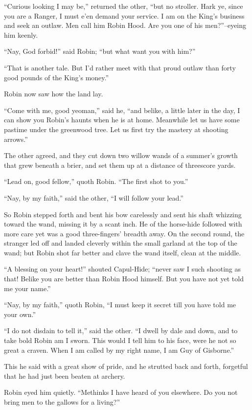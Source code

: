 ``Curious looking I may be,'' returned the other, ``but no stroller.
Hark ye, since you are a Ranger, I must e'en demand your service. I am
on the King's business and seek an outlaw. Men call him Robin Hood. Are
you one of his men?''--eyeing him keenly.

``Nay, God forbid!'' said Robin; ``but what want you with him?''

``That is another tale. But I'd rather meet with that proud outlaw than
forty good pounds of the King's money.''

Robin now saw how the land lay.

``Come with me, good yeoman,'' said he, ``and belike, a little later in
the day, I can show you Robin's haunts when he is at home. Meanwhile let
us have some pastime under the greenwood tree. Let us first try the
mastery at shooting arrows.''

The other agreed, and they cut down two willow wands of a summer's
growth that grew beneath a brier, and set them up at a distance of
threescore yards.

``Lead on, good fellow,'' quoth Robin. ``The first shot to you.''

``Nay, by my faith,'' said the other, ``I will follow your lead.''

So Robin stepped forth and bent his bow carelessly and sent his shaft
whizzing toward the wand, missing it by a scant inch. He of the
horse-hide followed with more care yet was a good three-fingers' breadth
away. On the second round, the stranger led off and landed cleverly
within the small garland at the top of the wand; but Robin shot far
better and clave the wand itself, clean at the middle.

``A blessing on your heart!'' shouted Capul-Hide; ``never saw I such
shooting as that! Belike you are better than Robin Hood himself. But you
have not yet told me your name.''

``Nay, by my faith,'' quoth Robin, ``I must keep it secret till you have
told me your own.''

``I do not disdain to tell it,'' said the other. ``I dwell by dale and
down, and to take bold Robin am I sworn. This would I tell him to his
face, were he not so great a craven. When I am called by my right name,
I am Guy of Gisborne.''

This he said with a great show of pride, and he strutted back and forth,
forgetful that he had just been beaten at archery.

Robin eyed him quietly. ``Methinks I have heard of you elsewhere. Do you
not bring men to the gallows for a living?''

